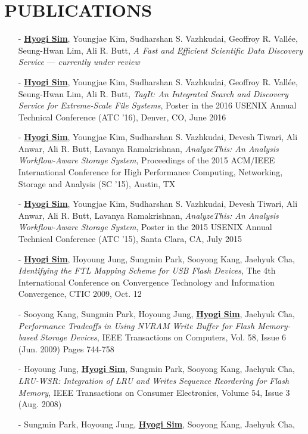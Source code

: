 \section{PUBLICATIONS} 
\begin{itemize}[leftmargin=*]
\setlength\itemsep{-0.02in}
\item[-] \underline{\bf Hyogi Sim}, Youngjae Kim, Sudharshan S. Vazhkudai,
  Geoffroy R. Vall\'ee, Seung-Hwan Lim, Ali R. Butt,
  {\it A Fast and Efficient Scientific Data Discovery Service}
  --- {\it \small currently under review}
\item[-] \underline{\bf Hyogi Sim}, Youngjae Kim, Sudharshan S. Vazhkudai,
  Geoffroy R. Vall\'ee, Seung-Hwan Lim, Ali R. Butt,
  {\it TagIt: An Integrated Search and Discovery Service for Extreme-Scale File
  Systems},
  Poster in the 2016 USENIX Annual Technical Conference (ATC '16),
  Denver, CO, June 2016 %
\item[-] \underline{\bf Hyogi Sim}, Youngjae Kim, Sudharshan S. Vazhkudai,
  Devesh Tiwari, Ali Anwar, Ali R. Butt, Lavanya Ramakrishnan,
  {\it AnalyzeThis: An Analysis Workflow-Aware Storage System},
  Proceedings of the 2015 ACM/IEEE International Conference for High
  Performance Computing, Networking, Storage and Analysis (SC '15), Austin, TX
\item[-] \underline{\bf Hyogi Sim}, Youngjae Kim, Sudharshan S. Vazhkudai,
  Devesh Tiwari, Ali Anwar, Ali R. Butt, Lavanya Ramakrishnan,
  {\it AnalyzeThis: An Analysis Workflow-Aware Storage System},
  Poster in the 2015 USENIX Annual Technical Conference (ATC '15),
  Santa Clara, CA, July 2015
\item[-] \underline{\bf Hyogi Sim}, Hoyoung Jung, Sungmin Park, Sooyong Kang, Jaehyuk Cha,
  {\it Identifying the FTL Mapping Scheme for USB Flash Devices},
  The 4th International Conference on Convergence Technology
  and Information Convergence, CTIC 2009, Oct. 12
\item[-] Sooyong Kang, Sungmin Park, Hoyoung Jung, \underline{\bf Hyogi Sim}, Jaehyuk Cha,
  {\it Performance Tradeoffs in Using NVRAM Write Buffer for Flash Memory-based
  Storage Devices},
  IEEE Transactions on Computers, Vol. 58, Issue 6 (Jun. 2009) Pages 744-758
\item[-] Hoyoung Jung, \underline{\bf Hyogi Sim}, Sungmin Park, Sooyong Kang, Jaehyuk Cha,
 {\it LRU-WSR: Integration of LRU and Writes Sequence Reordering for Flash
 Memory},
 IEEE Transactions on Consumer Electronics, Volume 54, Issue 3 (Aug. 2008)
\item[-] Sungmin Park, Hoyoung Jung, \underline{\bf Hyogi Sim}, Sooyong Kang, Jaehyuk Cha,

\end{itemize}
